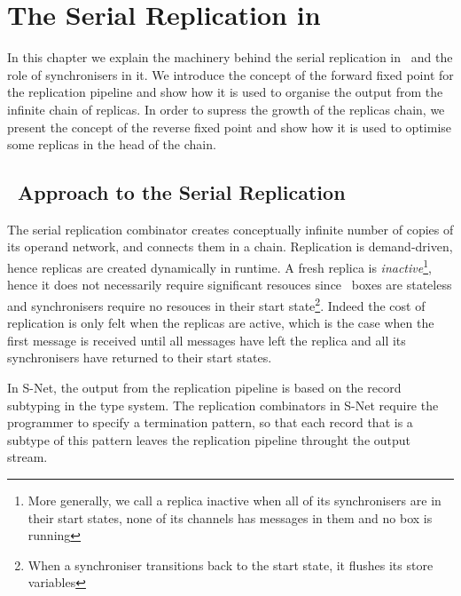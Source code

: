\chapter{The Serial Replication in \ak\ }
In this chapter we explain the machinery behind the serial replication in \ak\ and the role of synchronisers in it. We introduce the concept of the forward fixed point for the replication pipeline and show how it is used to organise the output from the infinite chain of replicas. In order to supress the growth of the replicas chain, we present the concept of the reverse fixed point and show how it is used to optimise some replicas in the head of the chain.


%


    \section{\ak\ Approach to the Serial Replication}
The serial replication combinator creates conceptually infinite number of copies of its operand network, and connects them in a chain. Replication is demand-driven, hence replicas are created dynamically in runtime. A fresh replica is \emph{inactive}\footnote{More generally, we call a replica inactive when all of its synchronisers are in their start states, none of its channels has messages in them and no box is running}, hence it does not necessarily require significant resouces since \ak\ boxes are stateless and synchronisers require no resouces in their start state\footnote{When a synchroniser transitions back to the start state, it flushes its store variables}. Indeed the cost of replication is only felt when the replicas are active, which is the case when the first message is received until all messages have left the replica and all its synchronisers have returned to their start states.

In S-Net, the output from the replication pipeline is based on the record subtyping in the type system. The replication combinators in S-Net require the programmer to specify a termination pattern, so that each record that is a subtype of this pattern leaves the replication pipeline throught the output stream.

